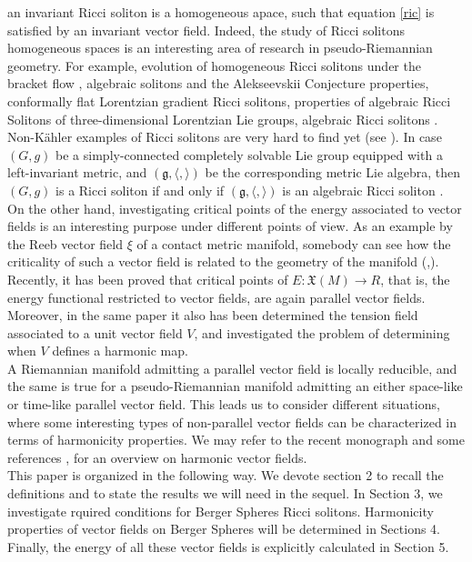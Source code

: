 \documentclass[11pt,oneside,leqno]{amsart}
\theoremstyle{plain}
\begin{document}
an invariant Ricci soliton is a homogeneous apace, such that equation \eqref{ric} is satisfied by an invariant vector field.
Indeed, the study of Ricci solitons homogeneous spaces is an interesting area
of research in pseudo-Riemannian geometry.
For example, evolution of homogeneous Ricci solitons under the bracket flow \cite{Lm}, algebraic solitons and the Alekseevskii Conjecture properties\cite{LM}, conformally flat Lorentzian gradient Ricci
solitons\cite{MB}, properties of algebraic Ricci Solitons of three-dimensional Lorentzian
Lie groups\cite{BA}, algebraic Ricci solitons \cite{Ba}. Non-K\"{a}hler examples of Ricci solitons are very hard to find yet (see \cite{DH}).
In case $(G, g)$ be a simply-connected completely solvable Lie
group equipped with a left-invariant metric, and $({{\mathfrak{g}}},\langle,\rangle )$ be the corresponding
metric Lie algebra, then $(G, g)$ is a Ricci soliton if and only if $({{\mathfrak{g}}},\langle ,\rangle)$ is an
algebraic Ricci soliton \cite{LJ}. \\
On the other hand, investigating critical points of the energy associated to vector fields is an interesting purpose
under different points of view. As an example by the
Reeb vector field $\xi$ of a contact metric manifold, somebody can see how the criticality of such a vector field is related to the geometry of the manifold (\cite{p1},\cite{p2}).
Recently, it has been \cite{g3} proved that critical points of $E:\mathfrak{X}(M)\rightarrow R$, that is,
the energy functional restricted to vector fields, are again parallel vector fields. Moreover,
in the same paper it also has been determined the tension field associated to a unit vector field $V$, and investigated the problem of determining when $V$ defines a harmonic map. \\
A Riemannian manifold admitting a parallel vector field is locally reducible, and the same is true for a
pseudo-Riemannian manifold admitting an either space-like or time-like parallel vector field. This leads us to consider different situations, where some interesting types of non-parallel vector fields can be characterized in terms of harmonicity properties. We may refer
to the recent monograph \cite{d11} and some references \cite{i}, \cite{n} for an overview on harmonic vector fields.\\
This paper is organized in the following way. We devote section 2 to recall the definitions and to state the results we will need in the sequel.
In Section 3, we investigate rquired conditions for Berger Spheres Ricci solitons. Harmonicity properties
of vector fields on Berger Spheres will be determined
in Sections 4. Finally, the energy of all these vector fields is explicitly calculated in Section 5.
\end{document}
